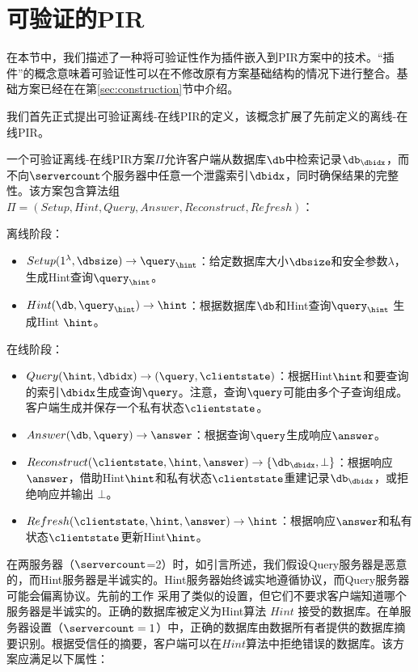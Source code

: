 \section{可验证的PIR}
在本节中，我们描述了一种将可验证性作为插件嵌入到PIR方案中的技术。“插件”的概念意味着可验证性可以在不修改原有方案基础结构的情况下进行整合。基础方案已经在在第\ref{sec:construction}节中介绍。

我们首先正式提出可验证离线-在线PIR的定义，该概念扩展了先前定义的离线-在线PIR。

\begin{definition}
    一个可验证离线-在线PIR方案$\Pi$允许客户端从数据库$\db$中检索记录$\db_\dbidx$，而不向$\servercount$个服务器中任意一个泄露索引$\dbidx$，同时确保结果的完整性。该方案包含算法组$\Pi = (Setup, Hint, Query, Answer, Reconstruct, Refresh)$：
    \begin{center}
        离线阶段：
        \begin{itemize}[leftmargin=*]
            \item $Setup(1^\lambda,\dbsize) \rightarrow \query_\hint$：给定数据库大小$\dbsize$和安全参数$\lambda$，生成Hint查询$\query_\hint$。
            \item $Hint(\db, \query_\hint) \rightarrow \hint$：根据数据库$\db$和Hint查询$\query_\hint$ 生成Hint $\hint$。
        \end{itemize}
        在线阶段：
        \begin{itemize}
            \item $Query(\hint, \dbidx) \rightarrow (\query, \clientstate)$：根据Hint$\hint$和要查询的索引$\dbidx$生成查询$\query$。注意，查询$\query$可能由多个子查询组成。客户端生成并保存一个私有状态$\clientstate$。
            \item $Answer(\db, \query) \rightarrow \answer$：根据查询$\query$生成响应$\answer$。
            \item $Reconstruct(\clientstate, \hint, \answer) \rightarrow \{\db_\dbidx, \bot\}$：根据响应$\answer$，借助Hint$\hint$和私有状态$\clientstate$重建记录$\db_\dbidx$，或拒绝响应并输出 $\bot$。
            \item $Refresh(\clientstate, \hint, \answer) \rightarrow \hint$：根据响应$\answer$和私有状态$\clientstate$更新Hint$\hint$。
        \end{itemize}
    \end{center}
    在两服务器（$\servercount$=2）时，如引言所述，我们假设Query服务器是恶意的，而Hint服务器是半诚实的。Hint服务器始终诚实地遵循协议，而Query服务器可能会偏离协议。先前的工作 \cite{APIR} 采用了类似的设置，但它们不要求客户端知道哪个服务器是半诚实的。正确的数据库被定义为Hint算法 $Hint$ 接受的数据库。在单服务器设置（$\servercount=1$）中，正确的数据库由数据所有者提供的数据库摘要识别。根据受信任的摘要，客户端可以在$Hint$算法中拒绝错误的数据库。该方案应满足以下属性：


\end{definition}
